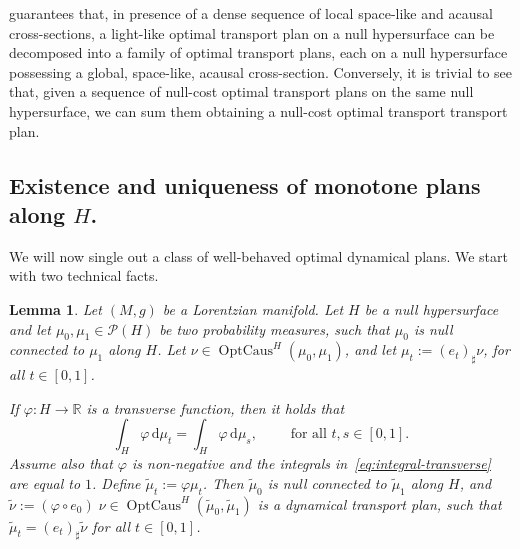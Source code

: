 \documentclass[12pt,a4paper]{amsart}
\theoremstyle{plain}
\newtheorem{lemma}{Lemma}[section]
\theoremstyle{definition}
\numberwithin{equation}{section}
\newcommand{\R}{\mathbb{R}}
\DeclareMathOperator{\OptCaus}{OptCaus}
\newcommand{\de}{{\mathrm{d}}}
\newcommand{\Prob}{\mathcal P}
\begin{document}
 guarantees that, in
presence of a dense sequence of local space-like and acausal cross-sections,
a light-like optimal transport plan on a null hypersurface can be decomposed into a family
of optimal transport plans, each on a null hypersurface possessing a  global, space-like,
acausal cross-section.
%
Conversely, it is trivial to see that, given a sequence of null-cost
optimal transport plans on the same null hypersurface, we can sum them
obtaining a null-cost optimal transport transport plan.
%







\subsection{Existence and uniqueness of monotone plans along $H$.}

We will now single out a class of well-behaved optimal dynamical plans. 
We start with two technical facts. 

\begin{lemma}
  \label{lem:integral-transverse}
Let $(M,g)$ be a Lorentzian manifold.
  Let $H$ be a null hypersurface and 
  let $\mu_0,\mu_1\in \Prob(H)$ be two probability measures, such that
  $\mu_0$ is null connected to $\mu_1$ along $H$.
  Let  $\nu\in\OptCaus^H(\mu_0,\mu_1)$, and let
  $\mu_t:=(e_t)_{\sharp}\nu$, for all $t\in [0,1]$.

  If $\varphi:H\to\R$ is a transverse function,
  then it holds that
  \begin{equation}
    \label{eq:integral-transverse}
    \int_H
    \varphi
    \,\de\mu_t
    =
    \int_H
    \varphi
    \,\de\mu_s
    ,
    \qquad
    \text{ for all }
    t,s\in[0,1]
    .
  \end{equation}
%
  Assume also that $\varphi$ is non-negative and the integrals in~\eqref{eq:integral-transverse} are equal to $1$.
  Define $\tilde \mu_t:= \varphi\mu_t$.
  Then $\tilde\mu_0$ is null connected to $\tilde\mu_1$ along $H$, and
  $\tilde\nu:=(\varphi \circ e_0)\; \nu \in  \OptCaus^H(\tilde\mu_0,\tilde\mu_1)$ 
  is a dynamical transport plan,
  such that
  $\tilde\mu_t=(e_t)_{\sharp}\tilde\nu$ for all $t\in [0,1]$.
\end{lemma}
\end{document}
